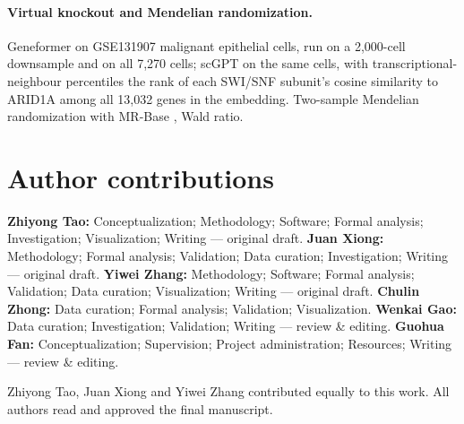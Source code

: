 \documentclass[11pt,a4paper]{article}
\begin{document}
\paragraph{Virtual knockout and Mendelian randomization.} Geneformer
\citep{theodoris2023} on GSE131907 malignant epithelial cells, run on a
2{,}000-cell downsample and on all 7{,}270 cells; scGPT \citep{cui2024} on the
same cells, with transcriptional-neighbour percentiles the rank of each SWI/SNF
subunit's cosine similarity to ARID1A among all 13{,}032 genes in the embedding.
Two-sample Mendelian randomization with MR-Base \citep{hemani2018}, Wald ratio.

\section*{Author contributions}
\noindent
\textbf{Zhiyong Tao:} Conceptualization; Methodology; Software; Formal analysis;
Investigation; Visualization; Writing --- original draft.
\textbf{Juan Xiong:} Methodology; Formal analysis; Validation; Data curation;
Investigation; Writing --- original draft.
\textbf{Yiwei Zhang:} Methodology; Software; Formal analysis; Validation; Data
curation; Visualization; Writing --- original draft.
\textbf{Chulin Zhong:} Data curation; Formal analysis; Validation;
Visualization.
\textbf{Wenkai Gao:} Data curation; Investigation; Validation; Writing ---
review \& editing.
\textbf{Guohua Fan:} Conceptualization; Supervision; Project administration;
Resources; Writing --- review \& editing.

\noindent Zhiyong Tao, Juan Xiong and Yiwei Zhang contributed equally to this
work. All authors read and approved the final manuscript.
\end{document}
